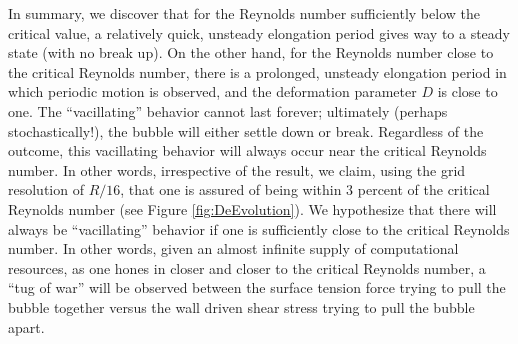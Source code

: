 \documentclass{elsarticle}
\begin{document}
\par\noindent

In summary, we discover that for the Reynolds number sufficiently below the critical value, a relatively quick, unsteady elongation period gives way to a steady state (with no break up).  On the other hand, for the Reynolds number close to the critical Reynolds number, there is a prolonged, unsteady elongation period in which periodic motion is observed, and the deformation parameter $D$ is close to one.  The ``vacillating'' behavior cannot last forever; ultimately (perhaps stochastically!), the bubble will either settle down or break.  Regardless of the outcome, this vacillating behavior will always occur near the critical Reynolds number.  In other words, irrespective of the result, we claim, using the grid resolution of $R/16$, that one is assured of being within 3 percent of the critical Reynolds number (see Figure \ref{fig:DeEvolution}).  We hypothesize that there will always be ``vacillating'' behavior if one is sufficiently close to the critical Reynolds number.  In other words, given an almost infinite supply of computational resources, as one hones in closer and closer to the critical Reynolds number, a ``tug of war'' will be observed between the surface tension force trying to pull the bubble together versus the wall driven shear stress trying to pull the bubble apart.
\end{document}
